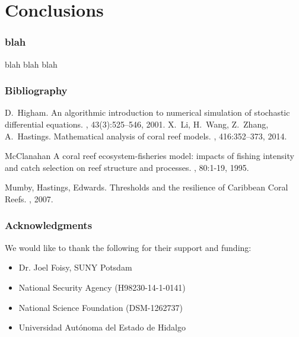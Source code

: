 
\section{Conclusions}


\begin{frame}
  \frametitle{blah}

  blah blah blah

\end{frame}

 
\begin{frame}
  \frametitle{Bibliography}

 \begin{thebibliography}{1}

   D.~Higham.
   \newblock An algorithmic introduction to numerical simulation of stochastic
   differential equations.
   , 43(3):525--546, 2001.
   X.~Li, H.~Wang, Z.~Zhang, A.~Hastings.
   \newblock Mathematical analysis of coral reef models.
   , 416:352--373, 2014.

    McClanahan
    \newblock A coral reef ecosystem-fisheries model: impacts of fishing intensity and catch selection on reef structure and processes.
    , 80:1-19, 1995.

    Mumby, Hastings, Edwards.
    \newblock Thresholds and the resilience of Caribbean Coral Reefs.
    , 2007.
  \end{thebibliography}
  
\end{frame}

\begin{frame}
  \frametitle{Acknowledgments}
  
  We would like to thank the following for their support and funding: 
  
 \begin{itemize}
 \item Dr. Joel Foisy, SUNY Potsdam
 \item National Security Agency (H98230-14-1-0141)
 \item National Science Foundation (DSM-1262737)
 \item Universidad Aut\'onoma del Estado de Hidalgo
 \end{itemize}
\end{frame}


